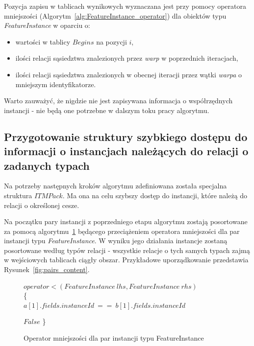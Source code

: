 \documentclass[12pt]{article}
\begin{document}
Pozycja zapisu w tablicach wynikowych wyznaczana jest przy pomocy operatora mniejszości (Algorytm~\ref{alg:FeatureInstance_operator}) dla obiektów typu \textit{FeatureInstance} w oparciu o:

\begin{itemize}
\item wartości w tablicy $ Begins $ na pozycji $i$,
\item ilości relacji sąsiedztwa znalezionych przez \textit{warp} w poprzednich iteracjach,
\item ilości relacji sąsiedztwa znalezionych w obecnej iteracji przez wątki \textit{warpa} o mniejszym identyfikatorze.
\end{itemize}

Warto zauważyć, że nigdzie nie jest zapisywana informacja o współrzędnych instancji - nie będą one potrzebne w dalszym toku pracy algorytmu.

\subsection{Przygotowanie struktury szybkiego dostępu do informacji o instancjach należących do relacji o zadanych typach}

Na potrzeby następnych kroków algorytmu zdefiniowana została specjalna struktura $ ITMPack $. Ma ona na celu szybszy dostęp do instancji, które należą do relacji o określonej cesze.

Na początku pary instancji z poprzedniego etapu algorytmu zostają posortowane za pomocą algorytmu~\ref{alg:FeatureInstancePair_operator} będącego przeciążeniem operatora mniejszości dla par instancji typu \textit{FeatureInstance}. W wyniku jego działania instancje zostaną posortowane według typów relacji - wszystkie relacje o tych samych typach zajmą w wejściowych tablicach ciągły obszar. Przykładowe uporządkowanie przedstawia Rysunek~\ref{fig:pairs_content}.

\begin{figure}[H]
\begin{algorithm}[H]
$operator<(FeatureInstance\ lhs,FeatureInstance\ rhs) $\\
\{\\
   {
       {
	  	 {
	  		\Return $ a[1].fields.instanceId\ ==\ b[1].fields.instanceId $ \;
	  	}
	  }
  }

  \Return $ False $ \;
\}

\caption{Operator mniejszości dla par instancji typu FeatureInstance}
\label{alg:FeatureInstancePair_operator}
\end{algorithm}
\end{figure}
\end{document}

